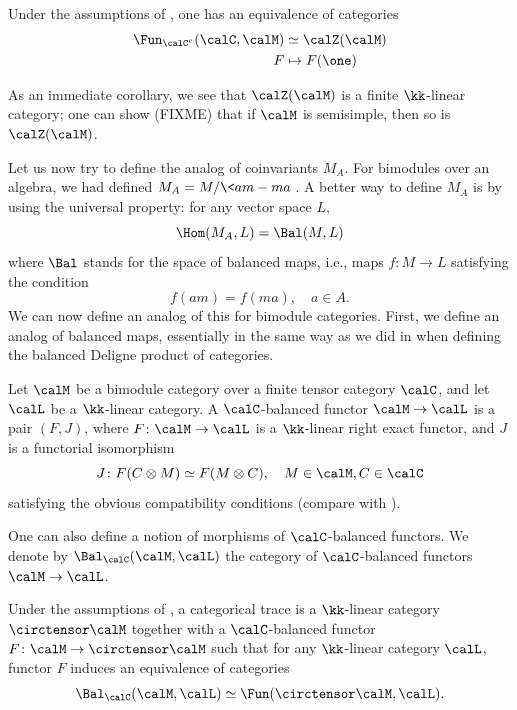 \begin{lemma}\label{l:cat-center-functor}
  Under the assumptions of ,
  one has an equivalence of categories
  \begin{align*}
  \Fun_{\calC^e}(\calC, \calM)&\simeq\calZ(\calM)\\
    F&\mapsto F(\one)
  \end{align*}
\end{lemma}

As an immediate corollary, we see that $\calZ(\calM)$ is a finite $\kk$-linear
category; one can show (FIXME) that if $\calM$ is semisimple, then so is
$\calZ(\calM)$.

Let us now try to define the analog of coinvariants $M_A$. For bimodules over
an algebra, we had defined $M_A=M/\<am-ma\>$. A better way to define $M_A$ is
by using the universal property: for any vector space $L$,
$$
  \Hom(M_A,L)=\Bal(M,L)
$$
where $\Bal$ stands for the space of balanced maps, i.e., maps $f\colon M\to L$
satisfying the condition
$$
  f(am)=f(ma), \quad a\in A.
$$
We can now define an analog of this for bimodule categories. First, we define an
analog of balanced maps, essentially in the same way as we did in
 when defining the balanced Deligne product of
categories.

\begin{definition}\label{d:balanced2}
  Let $\calM$ be a bimodule category over a finite tensor category $\calC$,
  and let $\calL$ be a $\kk$-linear category. A $\calC$-balanced functor
  $\calM\to\calL$ is a pair $(F,J)$, where $F\colon \calM\to\calL$ is a
  $\kk$-linear right exact functor, and $J$ is a functorial isomorphism
  $$
    J\colon F(C\otimes M)\simeq F(M\otimes C), \quad M\in \calM, C\in \calC
  $$
  satisfying the obvious compatibility conditions (compare with
  ).
\end{definition}

One can also define a notion of morphisms of $\calC$-balanced functors. We
denote by $\Bal_\calC(\calM, \calL)$ the category of
$\calC$-balanced functors $\calM\to \calL$.


\begin{definition}\label{d:cat-trace}
  Under the assumptions of , a categorical trace is a
  $\kk$-linear category $\circtensor\calM$ together with a
  $\calC$-balanced functor $F\colon \calM\to \circtensor \calM$
  such that for any $\kk$-linear category
  $\calL$, functor $F$ induces an equivalence of categories
  $$
    \Bal_\calC(\calM, \calL)\simeq
    \Fun(\circtensor \calM, \calL).
  $$
\end{definition}

